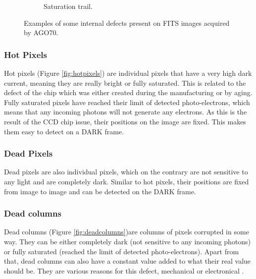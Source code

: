 \begin{figure}[!h]
\begin{subfigure}{.3\textwidth}
            \caption{Saturation trail.}
            \label{fig:saturationtrail}
        \end{subfigure}
        \caption{Examples of some internal defects present on FITS images acquired by AGO70.}
        \label{fig:internaldefects}
    \end{figure}
    
    
    
    
    
    \subsubsection{Hot Pixels}
    
    Hot pixels (Figure \ref{fig:hotpixels}) are individual pixels that have a very high dark current, meaning they are really bright or fully saturated. This is related to the defect of the chip which was either created during the manufacturing or by aging. Fully saturated pixels have reached their limit of detected photo-electrons, which means that any incoming photons will not generate any electrons. 
    As this is the result of the CCD chip issue, their positions on the image are fixed. This makes them easy to detect on a DARK frame.

        
    \subsubsection{Dead Pixels}
    
    Dead pixels are also individual pixels, which on the contrary are not sensitive to any light and are completely dark. Similar to hot pixels, their positions are fixed from image to image and can be detected on the DARK frame.
    
    \subsubsection{Dead columns} 
    
    Dead columns (Figure \ref{fig:deadcolumns})are columns of pixels corrupted in some way. %
    They can be either completely dark (not sensitive to any incoming photons) or fully saturated (reached the limit of detected photo-electrons). Apart from that, dead columns can also have a constant value added to what their real value should be. 
    They are various reasons for this defect, mechanical or electronical \cite{articleCCDartifacts}.
    

